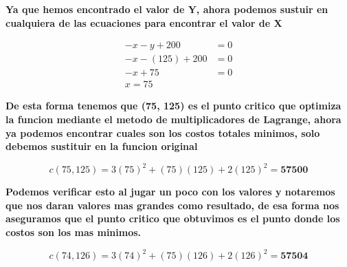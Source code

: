 \documentclass[13pt]{memoir}
\begin{document}
\begin{enumerate}
\textbf{Ya que hemos encontrado el valor de Y, ahora podemos sustuir en cualquiera de las ecuaciones para encontrar el valor de X}

\begin{align*}
-x - y + 200 &= 0 \tag{3} \label{eq:third} \\ 
-x - (125) + 200 &=0\\
-x + 75 & = 0\\
x = 75
\end{align*}

\textbf{De esta forma tenemos que (75, 125) es el punto critico que optimiza la funcion mediante el metodo de multiplicadores de Lagrange, ahora ya podemos encontrar cuales son los costos totales minimos, solo debemos sustituir en la funcion original}


\begin{equation*}
c(75, 125) = 3(75)^2 + (75)(125) + 2(125)^2 = \textbf{{57500}}
\end{equation*}

\textbf{Podemos verificar esto al jugar un poco con los valores y notaremos que nos daran valores mas grandes como resultado, de esa forma nos aseguramos que el punto critico que obtuvimos es el punto donde los costos son los mas minimos.}

\begin{equation*}
c(74, 126) = 3(74)^2 + (75)(126) + 2(126)^2 = \textbf{{57504}}
\end{equation*}



\end{enumerate}	
\end{document}
